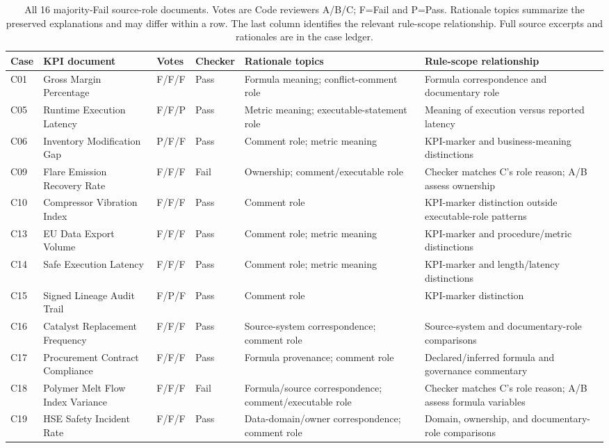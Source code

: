 \documentclass[a4paper,fleqn]{cas-dc}
\begin{document}
\begin{table}[t]
\centering
\small
\caption{All 16 majority-Fail source-role documents. Votes are Code reviewers A/B/C; F=Fail and P=Pass. Rationale topics summarize the preserved explanations and may differ within a row. The last column identifies the relevant rule-scope relationship. Full source excerpts and rationales are in the case ledger.}
\label{tab:ledger}
\begin{tabularx}{\textwidth}{@{}lp{}llYY@{}}
\toprule
Case & KPI document & Votes & Checker & Rationale topics & Rule-scope relationship \\
\midrule
C01 & Gross Margin Percentage & F/F/F & Pass & Formula meaning; conflict-comment role & Formula correspondence and documentary role \\
C05 & Runtime Execution Latency & F/F/P & Pass & Metric meaning; executable-statement role & Meaning of execution versus reported latency \\
C06 & Inventory Modification Gap & P/F/F & Pass & Comment role; metric meaning & KPI-marker and business-meaning distinctions \\
C09 & Flare Emission Recovery Rate & F/F/F & Fail & Ownership; comment/executable role & Checker matches C's role reason; A/B assess ownership \\
C10 & Compressor Vibration Index & F/F/F & Pass & Comment role & KPI-marker distinction outside executable-role patterns \\
C13 & EU Data Export Volume & F/F/F & Pass & Comment role; metric meaning & KPI-marker and procedure/metric distinctions \\
C14 & Safe Execution Latency & F/F/F & Pass & Comment role; metric meaning & KPI-marker and length/latency distinctions \\
C15 & Signed Lineage Audit Trail & F/P/F & Pass & Comment role & KPI-marker distinction \\
C16 & Catalyst Replacement Frequency & F/F/F & Pass & Source-system correspondence; comment role & Source-system and documentary-role comparisons \\
C17 & Procurement Contract Compliance & F/F/F & Pass & Formula provenance; comment role & Declared/inferred formula and governance commentary \\
C18 & Polymer Melt Flow Index Variance & F/F/F & Fail & Formula/source correspondence; comment/executable role & Checker matches C's role reason; A/B assess formula variables \\
C19 & HSE Safety Incident Rate & F/F/F & Pass & Data-domain/owner correspondence; comment role & Domain, ownership, and documentary-role comparisons \\

\end{tabularx}
\end{table}
\end{document}
